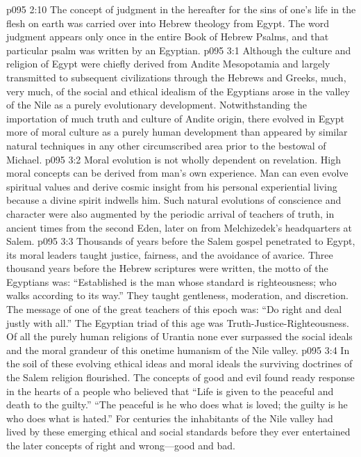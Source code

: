 \vs p095 2:10 The concept of judgment in the hereafter for the sins of one’s life in the flesh on earth was carried over into Hebrew theology from Egypt. The word judgment appears only once in the entire Book of Hebrew Psalms, and that particular psalm was written by an Egyptian.
\vs p095 3:1 Although the culture and religion of Egypt were chiefly derived from Andite Mesopotamia and largely transmitted to subsequent civilizations through the Hebrews and Greeks, much, very much, of the social and ethical idealism of the Egyptians arose in the valley of the Nile as a purely evolutionary development. Notwithstanding the importation of much truth and culture of Andite origin, there evolved in Egypt more of moral culture as a purely human development than appeared by similar natural techniques in any other circumscribed area prior to the bestowal of Michael.
\vs p095 3:2 Moral evolution is not wholly dependent on revelation. High moral concepts can be derived from man’s own experience. Man can even evolve spiritual values and derive cosmic insight from his personal experiential living because a divine spirit indwells him. Such natural evolutions of conscience and character were also augmented by the periodic arrival of teachers of truth, in ancient times from the second Eden, later on from Melchizedek’s headquarters at Salem.
\vs p095 3:3 Thousands of years before the Salem gospel penetrated to Egypt, its moral leaders taught justice, fairness, and the avoidance of avarice. Three thousand years before the Hebrew scriptures were written, the motto of the Egyptians was: “Established is the man whose standard is righteousness; who walks according to its way.” They taught gentleness, moderation, and discretion. The message of one of the great teachers of this epoch was: “Do right and deal justly with all.” The Egyptian triad of this age was Truth\hyp{}Justice\hyp{}Righteousness. Of all the purely human religions of Urantia none ever surpassed the social ideals and the moral grandeur of this onetime humanism of the Nile valley.
\vs p095 3:4 In the soil of these evolving ethical ideas and moral ideals the surviving doctrines of the Salem religion flourished. The concepts of good and evil found ready response in the hearts of a people who believed that “Life is given to the peaceful and death to the guilty.” “The peaceful is he who does what is loved; the guilty is he who does what is hated.” For centuries the inhabitants of the Nile valley had lived by these emerging ethical and social standards before they ever entertained the later concepts of right and wrong---good and bad.
